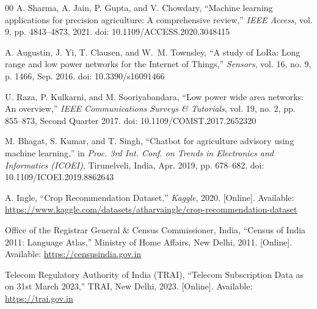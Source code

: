 \documentclass[10pt,twocolumn]{article}
\begin{document}
\begin{thebibliography}{00}
A. Sharma, A. Jain, P. Gupta, and V. Chowdary,
``Machine learning applications for precision agriculture: A comprehensive review,''
\textit{IEEE Access},
vol. 9, pp. 4843--4873, 2021.
doi: 10.1109/ACCESS.2020.3048415

A. Augustin, J. Yi, T. Clausen, and W.~M. Townsley,
``A study of LoRa: Long range and low power networks for the Internet of Things,''
\textit{Sensors},
vol. 16, no. 9, p. 1466, Sep. 2016.
doi: 10.3390/s16091466

U. Raza, P. Kulkarni, and M. Sooriyabandara,
``Low power wide area networks: An overview,''
\textit{IEEE Communications Surveys \& Tutorials},
vol. 19, no. 2, pp. 855--873, Second Quarter 2017.
doi: 10.1109/COMST.2017.2652320

M. Bhagat, S. Kumar, and T. Singh,
``Chatbot for agriculture advisory using machine learning,''
in \textit{Proc. 3rd Int. Conf. on Trends in Electronics and Informatics (ICOEI)},
Tirunelveli, India, Apr. 2019, pp. 678--682.
doi: 10.1109/ICOEI.2019.8862643

A. Ingle,
``Crop Recommendation Dataset,''
\textit{Kaggle}, 2020.
[Online]. Available: \url{https://www.kaggle.com/datasets/atharvaingle/crop-recommendation-dataset}

Office of the Registrar General \& Census Commissioner, India,
``Census of India 2011: Language Atlas,''
Ministry of Home Affairs, New Delhi, 2011.
[Online]. Available: \url{https://censusindia.gov.in}

Telecom Regulatory Authority of India (TRAI),
``Telecom Subscription Data as on 31st March 2023,''
TRAI, New Delhi, 2023.
[Online]. Available: \url{https://trai.gov.in}

\end{thebibliography}
\end{document}
